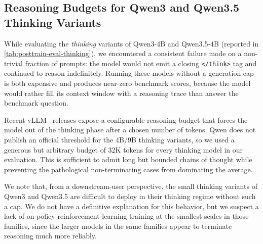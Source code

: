 \documentclass{llmxive}
\begin{document}
\subsection{Reasoning Budgets for Qwen3 and Qwen3.5 Thinking Variants}
\label{app:qwen-thinking-budget}

While evaluating the \emph{thinking} variants of Qwen3-4B and Qwen3.5-4B
(reported in \cref{tab:posttrain-eval-thinking}), we encountered a
consistent failure mode on a non-trivial fraction of prompts: the model
would not emit a closing \texttt{</think>} tag and continued to reason
indefinitely. Running these models without a generation cap is both
expensive and produces near-zero benchmark scores, 
because the model would rather fill its context window with a reasoning trace 
than answer the benchmark question. 

Recent vLLM~\cite{kwon2023vllm} releases expose a configurable reasoning
budget that forces the model out of the thinking phase after a chosen
number of tokens. Qwen does not publish an official threshold for the
4B/9B thinking variants, so we used a generous but arbitrary budget of
32K tokens for every thinking model in our evaluation. This is sufficient
to admit long but bounded chains of thought while preventing the
pathological non-terminating cases from dominating the average.

We note that, from a downstream-user perspective, the small thinking
variants of Qwen3 and Qwen3.5 are difficult to deploy in their thinking
regime without such a cap. We do not have a definitive explanation for
this behavior, but we suspect a lack of on-policy reinforcement-learning
training at the smallest scales in those families, since the larger
models in the same families appear to terminate reasoning much more
reliably.
\end{document}
